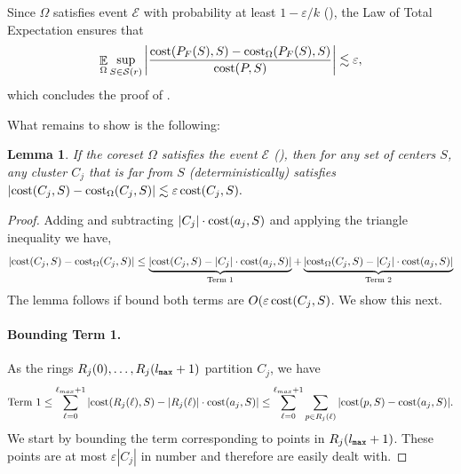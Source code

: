 \documentclass[11pt]{article}
\newtheorem{lemma}{Lemma}[section]
\theoremstyle{restate}
\theoremstyle{definition}
\newcommand{\eps}{\ensuremath{\varepsilon}}
\newcommand{\E}{\mathop{\mathbb{E}}}
\newcommand{\cost}{\textnormal{cost}}
\newcommand{\costom}{\cost_\Omega} %
\newcommand{\inSR}{\in \mathcal{S}(r)}
\newcommand{\lmax}{l_\ensuremath{\textnormal{\texttt{max}}}}
\newcommand{\calE}{\mathcal E}
\begin{document}
Since $\Omega$ satisfies event $\calE$ with probability at least $1-\eps/k$ (), the Law of Total Expectation ensures that
\[\E_{ \Omega} \sup_{S\inSR} \left\lvert \frac{\cost(P_F(S),S) - \costom(P_F(S),S)}{\cost(P,S)} \right\rvert \lesssim \eps,\] 
which concludes the proof of .


What remains to show is the following:
\begin{lemma}\label{lem: far-cluster}
If the coreset $\Omega$ satisfies the event $\mathcal E$ (), then for any set of centers $S$, any cluster $C_j$ that is far from $S$  (deterministically) satisfies  $|\cost (C_j,S) - \costom(C_j, S)| \lesssim  \eps\, \cost(C_j, S).$
\end{lemma}
\begin{proof}
Adding and subtracting $|C_j| \cdot \cost(a_j,S)$ and applying the triangle inequality we have, $$|\cost(C_j,S)- \costom(C_j,S)| \leq \underbrace{|\cost(C_j,S) - |C_j| \cdot \cost(a_j,S)|}_{\text{Term 1}} + \underbrace{|\costom(C_j,S) - |C_j| \cdot \cost(a_j,S)|}_{\text{Term 2}}$$
The lemma follows if bound both terms are $O(\eps\, \cost(C_j, S)$. We show this  next.
\paragraph{Bounding Term 1.}
As the rings $R_j(0), \ldots, R_j(\lmax + 1)$ partition $C_j$, we have
\begin{equation*}
     \text{Term 1} \leq \sum_{\ell= 0}^{\ell_{max}+1} |\cost(R_j(\ell), S) - |R_j(\ell)| \cdot \cost(a_j,S)| \leq \sum_{\ell= 0}^{\ell_{max}+1} \sum_{p \in R_j(\ell)} |\cost(p,S) - \cost(a_j,S)|.
\end{equation*} 
We start by bounding the term corresponding to points in $R_j(\lmax + 1)$. These points are at most $\eps |C_j|$ in number and therefore are easily dealt with.


\end{proof}
\end{document}
